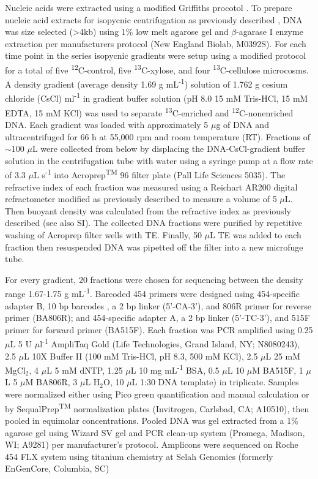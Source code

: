 Nucleic acids were extracted using a modified Griffiths procotol
\cite{Griffiths_2000}. To prepare nucleic acid extracts for isopycnic
centrifugation as previously described \cite{Buckley_2007}, DNA was size
selected (\textgreater 4kb) using 1\% low melt agarose gel and $\beta$-agarase
I enzyme extraction per manufacturers protocol (New England Biolab, M0392S).
For each time point in the series isopycnic gradients were setup using
a modified protocol \cite{Neufeld_2007} for a total of five
\textsuperscript{12}C-control, five \textsuperscript{13}C-xylose, and four
\textsuperscript{13}C-cellulose microcosms. A density gradient (average density
1.69 g mL\textsuperscript{-1}) solution of 1.762 g cesium chloride (CsCl)
ml\textsuperscript{-1} in gradient buffer solution (pH 8.0 15 mM Tris-HCl, 15
mM EDTA, 15 mM KCl) was used to separate \textsuperscript{13}C-enriched and
\textsuperscript{12}C-nonenriched DNA. Each gradient was loaded with
approximately 5 $\mu$g of DNA and ultracentrifuged for 66 h at 55,000 rpm and
room temperature (RT). Fractions of $\sim$100 $\mu$L were collected from below
by displacing the DNA-CsCl-gradient buffer solution in the centrifugation tube
with water using a syringe pump at a flow rate of 3.3 $\mu$L
s\textsuperscript{-1} \cite{Manefield_2002} into Acroprep\textsuperscript{TM}
96 filter plate (Pall Life Sciences 5035). The refractive index of each
fraction was measured using a Reichart AR200 digital refractometer modified as
previously described \cite{Buckley_2007} to measure a volume of 5 $\mu$L. Then
buoyant density was calculated from the refractive index as previously
described \cite{Buckley_2007} (see also SI). The
collected DNA fractions were purified by repetitive washing of Acroprep filter
wells with TE. Finally, 50 $\mu$L TE was added to each fraction then
resuspended DNA was pipetted off the filter into a new microfuge tube. 


For every gradient, 20 fractions were chosen for sequencing between the density
range 1.67-1.75 g mL\textsuperscript{-1}. Barcoded 454 primers were designed
using 454-specific adapter B, 10 bp barcodes \cite{Hamady_2008}, a 2 bp linker
(5'-CA-3'), and 806R primer for reverse primer (BA806R); and 454-specific
adapter A, a 2 bp linker  (5'-TC-3'), and 515F primer for forward primer
(BA515F). Each fraction was PCR amplified using 0.25 $\mu$L
5 U $\mu$l\textsuperscript{-1} AmpliTaq Gold (Life Technologies, Grand Island,
NY; N8080243), 2.5 $\mu$L 10X Buffer II (100 mM Tris-HCl, pH 8.3, 500 mM KCl),
2.5 $\mu$L 25 mM MgCl$_{2}$, 4 $\mu$L 5 mM dNTP, 1.25 $\mu$L 10 mg
mL\textsuperscript{-1} BSA, 0.5 $\mu$L 10 $\mu$M BA515F, 1 $\mu$L 5 $\mu$M
BA806R, 3 $\mu$L H$_{2}$O, 10 $\mu$L 1:30 DNA template) in triplicate. Samples
were normalized either using Pico green quantification and manual calculation
or by SequalPrep\textsuperscript{TM} normalization plates (Invitrogen,
Carlsbad, CA; A10510), then pooled in equimolar concentrations. Pooled DNA was
gel extracted from a 1\% agarose gel using Wizard SV gel and PCR clean-up
system (Promega, Madison, WI; A9281) per manufacturer's protocol. Amplicons
were sequenced on Roche 454 FLX system using titanium chemistry at Selah
Genomics (formerly EnGenCore, Columbia, SC)  

